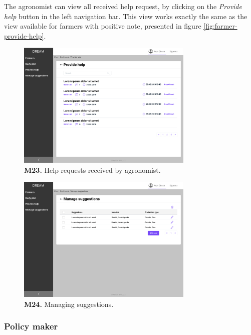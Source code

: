The agronomist can view all received help request, by clicking on the \textit{Provide help} button in the left navigation bar. This view works exactly the same as the view available for farmers with positive note, presented in figure \ref{fig:farmer-provide-help}.
\begin{figure}[H]
    \centering
    \includegraphics[width=0.75\textwidth]{mockups/Agronomist_Dashboard_Provide help.png}
    \caption{\textbf{M23.} Help requests received by agronomist.}
\end{figure}


\begin{figure}[H]
    \centering
    \includegraphics[width=0.75\textwidth]{mockups/Agronomist_Dashboard_Manage suggestions.png}
    \caption{\textbf{M24.} Managing suggestions.}
\end{figure}

\subsubsection{Policy maker}

